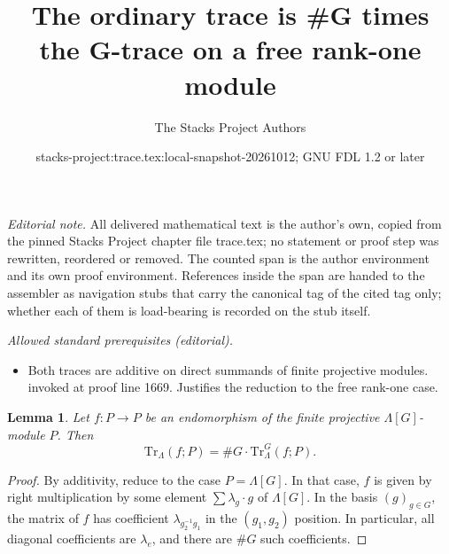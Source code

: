 \documentclass{stacks-project}
\title{The ordinary trace is \#G times the G-trace on a free rank-one module}
\author{The Stacks Project Authors}
\date{stacks-project:trace.tex:local-snapshot-20261012; GNU FDL 1.2 or later}
\theoremstyle{plain}
\newtheorem{lemma}[subsection]{Lemma}
\theoremstyle{definition}
\theoremstyle{remark}
\numberwithin{equation}{subsection}
\begin{document}
\maketitle
\setcounter{subsection}{1}
\noindent\textit{Editorial note.} All delivered mathematical text is the author's own, copied from the pinned Stacks Project chapter file trace.tex; no statement or proof step was rewritten, reordered or removed. The counted span is the author environment and its own proof environment. References inside the span are handed to the assembler as navigation stubs that carry the canonical tag of the cited tag only; whether each of them is load-bearing is recorded on the stub itself.\par\medskip
\noindent\textit{Allowed standard prerequisites (editorial).}\begin{itemize}
\item Both traces are additive on direct summands of finite projective modules. invoked at proof line 1669. Justifies the reduction to the free rank-one case.
\end{itemize}\medskip
\begin{lemma}
\label{lemma-lambda-trace}
Let $f : P\to P$ be an endomorphism of the finite projective
$\Lambda[G]$-module $P$. Then
$$
\text{Tr}_{\Lambda}(f; P) = \# G \cdot \text{Tr}_\Lambda^G(f; P).
$$
\end{lemma}

\begin{proof}
By additivity, reduce to the case $P = \Lambda[G]$.
In that case, $f$ is given by
right multiplication by some element $\sum\lambda_g\cdot g$ of $\Lambda[G]$. In
the basis $(g)_{g \in G}$, the matrix of $f$ has coefficient
$\lambda_{g_2^{-1}g_1}$ in the $(g_1, g_2)$ position. In particular, all
diagonal coefficients are $\lambda_e$, and there are $\# G$ such coefficients.
\end{proof}
\end{document}
